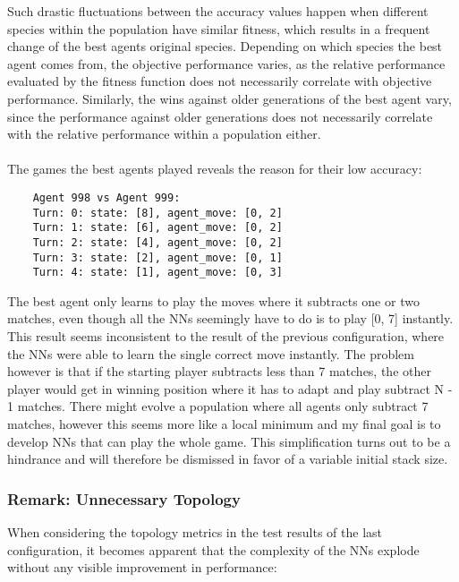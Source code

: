 Such drastic fluctuations between the accuracy values happen when different species within the population have similar fitness, which results in a frequent change of the best agents original species.
Depending on which species the best agent comes from, the objective performance varies, as the relative performance evaluated by the fitness function does not necessarily correlate with objective performance.
Similarly, the wins against older generations of the best agent vary, since the performance against older generations does not necessarily correlate with the relative performance within a population either.
\\ \\
The games the best agents played reveals the reason for their low accuracy:
\begin{verbatim}
    Agent 998 vs Agent 999:
    Turn: 0: state: [8], agent_move: [0, 2]
    Turn: 1: state: [6], agent_move: [0, 2]
    Turn: 2: state: [4], agent_move: [0, 2]
    Turn: 3: state: [2], agent_move: [0, 1]
    Turn: 4: state: [1], agent_move: [0, 3]
\end{verbatim}
The best agent only learns to play the moves where it subtracts one or two matches, even though all the NNs seemingly have to do is to play [0, 7] instantly.
This result seems inconsistent to the result of the previous configuration, where the NNs were able to learn the single correct move instantly.
The problem however is that if the starting player subtracts less than 7 matches, the other player would get in winning position where it has to adapt and play subtract N - 1 matches.
There might evolve a population where all agents only subtract 7 matches, however this seems more like a local minimum and my final goal is to develop NNs that can play the whole game.
This simplification turns out to be a hindrance and will therefore be dismissed in favor of a variable initial stack size.

\subsubsection{Remark: Unnecessary Topology}
When considering the topology metrics in the test results of the last configuration, it becomes apparent that the complexity of the NNs explode without any visible improvement in performance:
\renewcommand{\csvpath}{../data/simple_nim/stack_8/t_1/stats.csv} %


